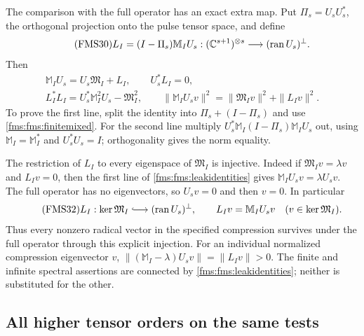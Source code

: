 The comparison with the full operator has an exact extra map.
Put $\Pi_s=U_sU_s^*$, the orthogonal projection onto the pulse
tensor space, and define
\begin{equation}\tag{FMS30}\label{fms:fms:leakage}
 L_I=(I-\Pi_s)\mathbb M_IU_s:
       (\mathbb C^{s+1})^{\otimes s}\longrightarrow
       (\operatorname{ran}U_s)^\perp.
\end{equation}
Then
\begin{equation}\tag{FMS31}\label{fms:fms:leakidentities}
 \begin{gathered}
 \mathbb M_IU_s=U_s\mathfrak M_I+L_I,\qquad U_s^*L_I=0,\\
 L_I^*L_I=U_s^*\mathbb M_I^2U_s-\mathfrak M_I^2,\qquad
 \|\mathbb M_IU_sv\|^2
       =\|\mathfrak M_Iv\|^2+\|L_Iv\|^2.
 \end{gathered}
\end{equation}
To prove the first line, split the identity into $\Pi_s+(I-\Pi_s)$
and use \eqref{fms:fms:finitemixed}. For the second line multiply
$U_s^*\mathbb M_I(I-\Pi_s)\mathbb M_IU_s$ out, using
$\mathbb M_I=\mathbb M_I^*$ and $U_s^*U_s=I$; orthogonality
gives the norm equality.

The restriction of $L_I$ to every eigenspace of
$\mathfrak M_I$ is injective. Indeed if
$\mathfrak M_Iv=\lambda v$ and $L_Iv=0$, then the first line
of \eqref{fms:fms:leakidentities} gives
$\mathbb M_IU_sv=\lambda U_sv$. The full operator has no
eigenvectors, so $U_sv=0$ and then $v=0$. In particular
\begin{equation}\tag{FMS32}\label{fms:fms:radicalmap}
 L_I:\ker\mathfrak M_I\lhook\joinrel\longrightarrow
       (\operatorname{ran}U_s)^\perp,\qquad
 L_Iv=\mathbb M_IU_sv\quad(v\in\ker\mathfrak M_I).
\end{equation}
Thus every nonzero radical vector in the specified compression
survives under the full operator through this explicit injection.
For an individual normalized compression eigenvector $v$,
$\|(\mathbb M_I-\lambda)U_sv\|=\|L_Iv\|>0$.
The finite and infinite spectral assertions are connected by
\eqref{fms:fms:leakidentities}; neither is substituted for the other.

\subsection{All higher tensor orders on the same tests}

